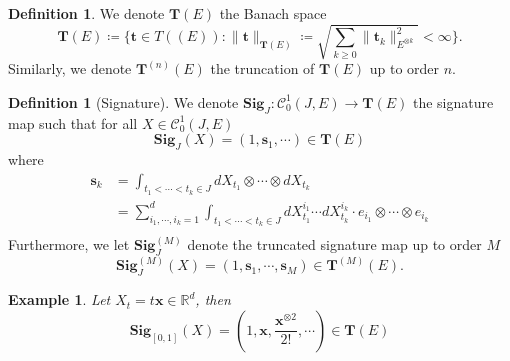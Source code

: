 \documentclass[12pt]{report}
\newtheorem{example}[theorem]{Example}
\theoremstyle{definition}
\newtheorem{definition}[theorem]{Definition}
\theoremstyle{remark}
\newcommand{\R}{\mathbb{R}}
\begin{document}
\begin{definition}
  We denote $\mathbf{T}(E)$ the Banach space 
  \begin{equation}
    \mathbf{T}(E) \coloneq \bigg\{\mathbf{t} \in T((E)) \colon \lVert \mathbf{t}\rVert_{\mathbf{T}(E)} \coloneq \sqrt{\sum_{k\geq 0}\lVert \mathbf{t}_{k}\rVert_{E^{\otimes k}}^{2} } < \infty \bigg\}.
  \end{equation} 
  Similarly, we denote $\mathbf{T}^{(n)}(E)$ the truncation of $\mathbf{T}(E)$ up to order $n$.
\end{definition}

\begin{definition}[Signature]
  We denote $\mathbf{Sig}_{J} \colon \mathcal{C}^{1}_{0}(J,E) \to \mathbf{T}(E)$ the signature map such that for all $X \in \mathcal{C}^{1}_{0}(J,E)$
  \begin{equation}
    \mathbf{Sig}_{J}(X) = (1, \mathbf{s}_{1},\cdots) \in \mathbf{T}(E)
  \end{equation}
  where 
  \begin{equation}
    \begin{split}
      \mathbf{s}_{k} &= \int_{t_{1}<\cdots< t_{k} \in J}dX_{t_{1}}\otimes\cdots\otimes dX_{t_{k}}\\
      &= \sum_{i_{1},\cdots,i_{k} = 1}^{d} \int_{t_{1}<\cdots< t_{k} \in J}dX_{t_{1}}^{i_{1}}\cdots dX_{t_{k}}^{i_{k}} \cdot e_{i_{1}}\otimes\cdots\otimes e_{i_{k}} \\
    \end{split}
  \end{equation}
  Furthermore, we let $\mathbf{Sig}^{(M)}_{J}$ denote the truncated signature map up to order $M$
  \begin{equation}
    \mathbf{Sig}^{(M)}_{J}(X) = (1, \mathbf{s}_{1},\cdots, \mathbf{s}_{M}) \in \mathbf{T}^{(M)}(E).
  \end{equation}
\end{definition}
\begin{example}\label{linear}
  Let $X_{t} = t\mathbf{x} \in \R^{d}$, then 
  \begin{equation}
    \mathbf{Sig}_{[0,1]}(X) = (1, \mathbf{x},\frac{\mathbf{x}^{\otimes 2}}{2!}, \cdots) \in \mathbf{T}(E)
  \end{equation}
\end{example}
\end{document}
